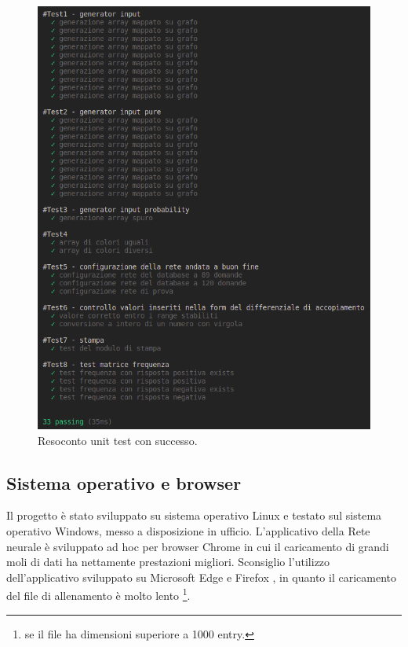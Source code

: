 \begin{figure}[H]
\centering
	\includegraphics[width=0.80\linewidth]{./image/recap_test.png}
	\caption{Resoconto unit test con successo.}
	\label{Resoconto unit test con successo.}
\end{figure}
\noindent

\subsection{Sistema operativo e browser}
Il progetto \`e stato sviluppato su sistema operativo Linux e testato sul sistema operativo Windows, messo a disposizione in ufficio. L'applicativo della Rete neurale \`e sviluppato ad hoc per browser Chrome in cui il caricamento di grandi moli di dati ha nettamente prestazioni migliori. Sconsiglio l'utilizzo dell'applicativo sviluppato su Microsoft Edge e Firefox , in quanto il caricamento del file di allenamento \`e molto lento \footnote{se il file ha dimensioni superiore a 1000 entry.}.

